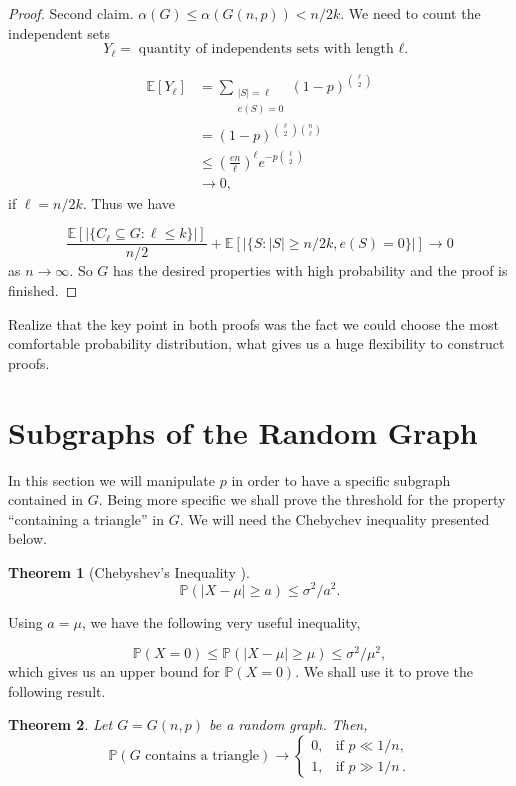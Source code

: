 \documentclass[12pt,twoside,a4paper,bibliography=totocnumbered]{book}
\numberwithin{equation}{section}
\newtheorem{theorem}             {Theorem}[section]
\theoremstyle{remark}
\begin{document}
\begin{proof}
Second claim. $\alpha(G) \leq \alpha (G(n,p)) < n/2k$. We need to count the independent sets
$$Y_{\ell} = \text{quantity of independents sets with length ${\ell}$. }$$

\begin{align*}
\mathbb{E}[Y_{\ell}] &= \sum_{\substack{|S| = {\ell} \\ e(S) = 0 }} (1-p)^{\binom{{\ell}}{2}}\\
	       &= (1-p)^{\binom{{\ell}}{2} \binom{n}{{\ell}}} \\
	       &\leq \left(\frac{en}{{\ell}}\right)^{\ell} e^{-p\binom{{\ell}}{2}}\\
	       &\rightarrow 0,
\end{align*}
if $\ell = n/2k$. Thus we have

$$\frac{\mathbb{E}[|\{C_{\ell} \subseteq G : {\ell}\leq k \}|]}{n/2} + \mathbb{E} [|\{ S:|S| \geq n/2k, e(S) = 0\}|] \rightarrow 0$$
as $n \rightarrow \infty $. So $G$ has the desired properties with high probability and the proof is finished.
\end{proof}

Realize that the key point in both proofs was the fact we could choose the most comfortable probability distribution, what gives us a huge flexibility to construct proofs.

\section{Subgraphs of the Random Graph}

In this section we will manipulate $p$ in order to have a specific subgraph contained in $G$. Being more specific we shall prove the threshold for the property ``containing a triangle'' in $G$.  We will need the Chebychev inequality presented below.

\begin{theorem}[{Chebyshev's Inequality \cite{Ch67}}]
$$\mathbb{P}(|X-\mu| \geq a) \leq \sigma^2/a^2.$$
\end{theorem} 

Using $a = \mu$, we have the following very useful inequality,

$$\mathbb{P}(X=0) \leq \mathbb{P}(|X-\mu | \geq \mu) \leq \sigma^2/\mu^2,$$
which gives us an upper bound for $\mathbb{P}(X=0)$. We shall use it to prove the following result.\\

\begin{theorem}
Let $G=G(n,p)$ be a random graph.
Then,
$$
\mathbb{P}(G\text{ contains a triangle}) \rightarrow 
\begin{cases}
		0, &\text{if $p\ll 1/n$},\\
		1, &\text{if $p\gg 1/n$}\,.
\end{cases}
$$
\end{theorem}
\end{document}
